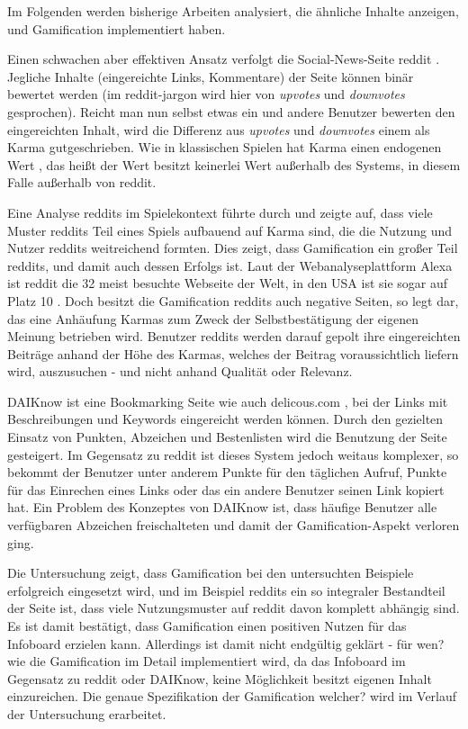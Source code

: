 \documentclass[12pt,twoside]{book}
\begin{document}
Im Folgenden werden bisherige Arbeiten analysiert, die ähnliche Inhalte anzeigen, und Gamification implementiert haben.

Einen schwachen aber effektiven Ansatz verfolgt die Social-News-Seite reddit \cite{reddit}. Jegliche Inhalte (eingereichte Links, Kommentare) der Seite können binär bewertet werden (im reddit-jargon wird hier von \textit{upvotes} und \textit{downvotes} gesprochen). Reicht man nun selbst etwas ein und andere Benutzer bewerten den eingereichten Inhalt, wird die Differenz aus \textit{upvotes} und \textit{downvotes} einem als Karma gutgeschrieben. Wie in klassischen Spielen hat Karma einen endogenen Wert \citep[pp. 21 - 22]{costikyan2005have}, das heißt der Wert besitzt keinerlei Wert außerhalb des Systems, in diesem Falle außerhalb von reddit.

Eine Analyse reddits im Spielekontext führte \cite{massanari2013playful} durch und zeigte auf, dass viele Muster reddits Teil eines Spiels aufbauend auf Karma sind, die die Nutzung und Nutzer reddits weitreichend formten.
Dies zeigt, dass Gamification ein großer Teil reddits, und damit auch dessen Erfolgs ist. Laut der Webanalyseplattform Alexa ist reddit die 32 meist besuchte Webseite der Welt, in den USA ist sie sogar auf Platz 10 \cite{alexa}.
Doch besitzt die Gamification reddits auch negative Seiten, so legt \citep{richerichkarma}  dar, das eine Anhäufung Karmas zum Zweck der Selbstbestätigung der eigenen Meinung betrieben wird. Benutzer reddits werden darauf gepolt ihre eingereichten Beiträge anhand der Höhe des Karmas, welches der Beitrag voraussichtlich liefern wird, auszusuchen - und nicht anhand Qualität oder Relevanz.

DAIKnow \citep{meder2014daiknow} ist eine Bookmarking Seite wie auch delicous.com \cite{delicious}, bei der Links mit Beschreibungen und Keywords eingereicht werden können. Durch den gezielten Einsatz von Punkten, Abzeichen und Bestenlisten wird die Benutzung der Seite gesteigert. Im Gegensatz zu reddit ist dieses System jedoch weitaus komplexer, so bekommt der Benutzer unter anderem Punkte für den täglichen Aufruf, Punkte für das Einrechen eines Links oder das ein andere Benutzer seinen Link kopiert hat.
Ein Problem des Konzeptes von DAIKnow ist, dass häufige Benutzer alle verfügbaren Abzeichen freischalteten und damit der Gamification-Aspekt verloren ging.

Die Untersuchung zeigt, dass Gamification bei den untersuchten Beispiele erfolgreich eingesetzt wird, und im Beispiel reddits ein so integraler Bestandteil der Seite ist, dass viele Nutzungsmuster auf reddit davon komplett abhängig sind. Es ist damit bestätigt, dass Gamification einen positiven Nutzen für das Infoboard erzielen kann. Allerdings ist damit nicht endgültig geklärt - für wen? wie die Gamification im Detail implementiert wird, da das Infoboard im Gegensatz zu reddit oder DAIKnow, keine Möglichkeit besitzt eigenen Inhalt einzureichen. Die genaue Spezifikation der Gamification welcher? wird im Verlauf der Untersuchung erarbeitet.
\end{document}
